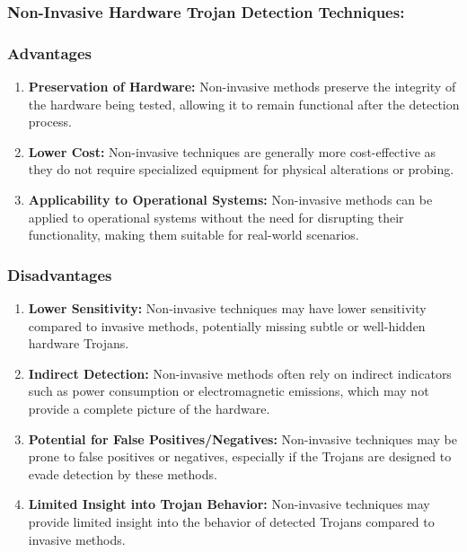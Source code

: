 \subsubsection{Non-Invasive Hardware Trojan Detection Techniques:}
\paragraph*{}
\subsubsection{Advantages}
\begin{enumerate}
	\item \textbf{Preservation of Hardware:} Non-invasive methods preserve the integrity of the hardware being tested, allowing it to remain functional after the detection process.
	\item \textbf{Lower Cost:} Non-invasive techniques are generally more cost-effective as they do not require specialized equipment for physical alterations or probing.
	\item \textbf{Applicability to Operational Systems:} Non-invasive methods can be applied to operational systems without the need for disrupting their functionality, making them suitable for real-world scenarios.
\end{enumerate}
\subsubsection{Disadvantages}
\begin{enumerate}
	\item \textbf{Lower Sensitivity:} Non-invasive techniques may have lower sensitivity compared to invasive methods, potentially missing subtle or well-hidden hardware Trojans.
	\item\textbf{ Indirect Detection:} Non-invasive methods often rely on indirect indicators such as power consumption or electromagnetic emissions, which may not provide a complete picture of the hardware.
	\item \textbf{Potential for False Positives/Negatives:} Non-invasive techniques may be prone to false positives or negatives, especially if the Trojans are designed to evade detection by these methods.
	\item \textbf{Limited Insight into Trojan Behavior:} Non-invasive techniques may provide limited insight into the behavior of detected Trojans compared to invasive methods.
\end{enumerate}
